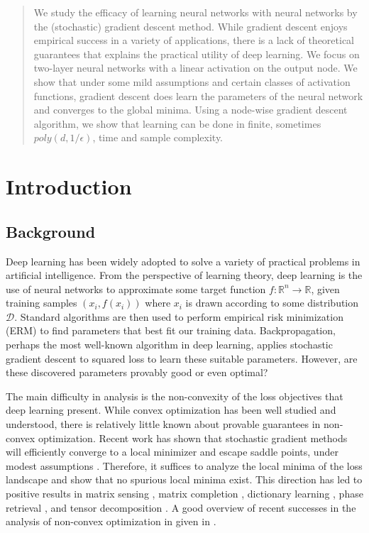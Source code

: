 \documentclass{article}
\newcommand{\R}{{\mathbb{R}}}
\begin{document}
\begin{abstract} 
We study the efficacy of learning neural networks with neural networks by the (stochastic) gradient descent method. While gradient descent enjoys empirical success in a variety of applications, there is a lack of theoretical guarantees that explains the practical utility of deep learning. We focus on two-layer neural networks with a linear activation on the output node. We show that under some mild assumptions and certain classes of activation functions, gradient descent does learn the parameters of the neural network and converges to the global minima. Using a node-wise gradient descent algorithm, we show that learning can be done in finite, sometimes $poly(d,1/\epsilon)$, time and sample complexity.
\end{abstract} 

\section{Introduction}

\subsection{Background}
Deep learning has been widely adopted to solve a variety of practical problems in artificial intelligence. From the perspective of learning theory, deep learning is the use of neural networks to approximate some target function $f: \R^n \to \R$, given training samples $(x_i,f(x_i))$ where $x_i$ is drawn according to some distribution $\mathcal{D}$. Standard algorithms are then used to perform empirical risk minimization (ERM) to find parameters that best fit our training data. Backpropagation, perhaps the most well-known algorithm in deep learning, applies stochastic gradient descent to squared loss to learn these suitable parameters. However, are these discovered parameters provably good or even optimal? 

The main difficulty in analysis is the non-convexity of the loss objectives that deep learning present. While convex optimization has been well studied and understood, there is relatively little known about provable guarantees in non-convex optimization. Recent work has shown that stochastic gradient methods will efficiently converge to a local minimizer and escape saddle points, under modest assumptions \cite{GeHJY15}. Therefore, it suffices to analyze the local minima of the loss landscape and show that no spurious local minima exist. This direction has led to positive results in matrix sensing \cite{ParkKCS16a}, matrix completion \cite{GeLM16}, dictionary learning \cite{SunQW15}, phase retrieval \cite{SunQW16}, and tensor decomposition \cite{GeHJY15}. A good overview of recent successes in the analysis of non-convex optimization in given in \cite{SunQW15a}.
\end{document}
